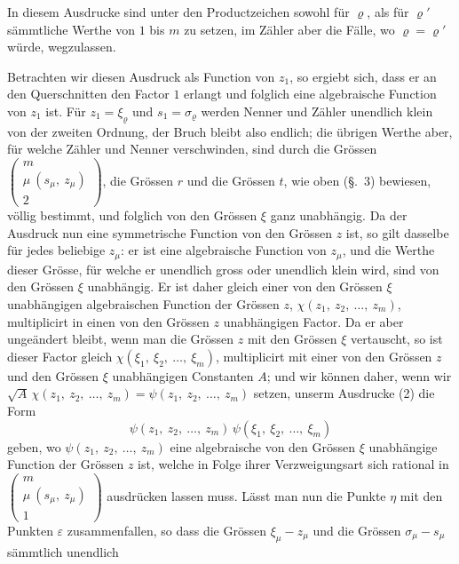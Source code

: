 \documentclass[12pt,a4paper]{article}
\begin{document}
In diesem Ausdrucke sind unter den Productzeichen sowohl für $\varrho$, als für $\varrho'$ sämmtliche Werthe von $1$ bis $m$ zu setzen, im Zähler aber die Fälle, wo $\varrho = \varrho'$ würde, wegzulassen.

Betrachten wir diesen Ausdruck als Function von $z_1$, so ergiebt sich, dass er an den Querschnitten den Factor $1$ erlangt und folglich eine algebraische Function von $z_1$ ist. Für $z_1 = \xi_\varrho$ und $s_1 = \sigma_\varrho$ werden Nenner und Zähler unendlich klein von der zweiten Ordnung, der Bruch bleibt also endlich; die übrigen Werthe aber, für welche Zähler und Nenner verschwinden, sind durch die Grössen $\left(\begin{array}{c} m\\ \mu\ (s_\mu,\ z_\mu)\\ 2 \end{array}\right)$, die Grössen $r$ und die Grössen $t$, wie oben (\S.~3) bewiesen, völlig bestimmt, und folglich von den Grössen $\xi$ ganz unabhängig. Da der Ausdruck nun eine symmetrische Function von den Grössen $z$ ist, so gilt dasselbe für jedes beliebige $z_\mu$: er ist eine algebraische Function von $z_\mu$, und die Werthe dieser Grösse, für welche er unendlich gross oder unendlich klein wird, sind von den Grössen $\xi$ unabhängig. Er ist daher gleich einer von den Grössen $\xi$ unabhängigen algebraischen Function der Grössen $z$, $\chi(z_1,\ z_2,\ \ldots,\ z_m)$, multiplicirt in einen von den Grössen $z$ unabhängigen Factor. Da er aber ungeändert bleibt, wenn man die Grössen $z$ mit den Grössen $\xi$ vertauscht, so ist dieser Factor gleich $\chi(\xi_1,\ \xi_2,\ \ldots,\ \xi_m)$, multiplicirt mit einer von den Grössen $z$ und den Grössen $\xi$ unabhängigen Constanten $A$; und wir können daher, wenn wir $\sqrt{A}\,\chi(z_1,\ z_2,\ \ldots,\ z_m) = \psi(z_1,\ z_2,\ \ldots,\ z_m)$ setzen, unserm Ausdrucke (2) die Form
\begin{equation}
\tag{3} \psi(z_1,\ z_2,\ \ldots,\ z_m)\,\psi(\xi_1,\ \xi_2,\ \ldots,\ \xi_m) \end{equation}
geben, wo $\psi(z_1,\ z_2,\ \ldots,\ z_m)$ eine algebraische von den Grössen $\xi$ unabhängige Function der Grössen $z$ ist, welche in Folge ihrer Verzweigungsart sich rational in $\left(\begin{array}{c} m\\ \mu\ (s_\mu,\ z_\mu)\\ 1 \end{array}\right)$ ausdrücken lassen muss. Lässt man nun die Punkte $\eta$ mit den Punkten $\varepsilon$ zusammenfallen, so dass die Grössen $\xi_\mu - z_\mu$ und die Grössen $\sigma_\mu - s_\mu$ sämmtlich unendlich
\end{document}
